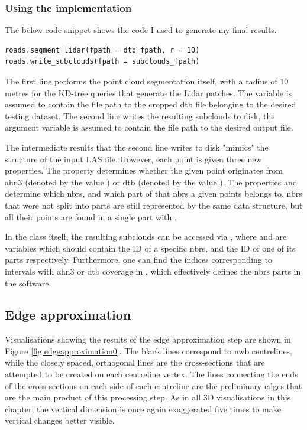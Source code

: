 \subsubsection{Using the implementation}

The below code snippet shows the code I used to generate my final results.

\begin{verbatim}
roads.segment_lidar(fpath = dtb_fpath, r = 10)
roads.write_subclouds(fpath = subclouds_fpath)
\end{verbatim}

The first line performs the point cloud segmentation itself, with a radius of 10 metres for the KD-tree queries that generate the Lidar patches. The variable  is assumed to contain the file path to the cropped \ac{dtb} file belonging to the desired testing dataset. The second line writes the resulting subclouds to disk, the argument variable is assumed to contain the file path to the desired output file.

The intermediate results that the second line writes to disk "mimics" the structure of the input LAS file. However, each point is given three new properties. The property  determines whether the given point originates from \ac{ahn3} (denoted by the value ) or \ac{dtb} (denoted by the value ). The properties  and  determine which \ac{nbrs}, and which part of that \ac{nbrs} a given points belongs to. \ac{nbrs} that were not split into parts are still represented by the same data structure, but all their points are found in a single part with .

In the class itself, the resulting subclouds can be accessed via , where  and  are variables which should contain the ID of a specific \ac{nbrs}, and the ID of one of its parts respectively. Furthermore, one can find the indices corresponding to intervals with \ac{ahn3} or \ac{dtb} coverage in , which effectively defines the \ac{nbrs} parts in the software.

\subsection{Edge approximation}
\label{sub:r_edgeapproximation}

Visualisations showing the results of the edge approximation step are shown in Figure \ref{fig:edgeapproximation0}. The black lines correspond to \ac{nwb} centrelines, while the closely spaced, orthogonal lines are the cross-sections that are attempted to be created on each centreline vertex. The lines connecting the ends of the cross-sections on each side of each centreline are the preliminary edges that are the main product of this processing step. As in all 3D visualisations in this chapter, the vertical dimension is once again exaggerated five times to make vertical changes better visible.

